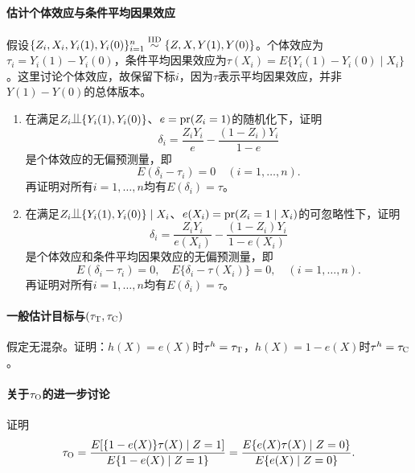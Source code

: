 \paragraph{估计个体效应与条件平均因果效应}\label{hw::individual-effect-prediction}

假设$\{ Z_i, X_i, Y_i(1), Y_i(0) \}_{i=1}^n \stackrel{\textup{IID}}{\sim} \{ Z, X, Y(1), Y(0) \}$。个体效应为$\tau_i = Y_i(1) - Y_i(0)$，条件平均因果效应为$\tau(X_i) = E\{ Y_i(1) - Y_i(0) \mid X_i  \}$。这里讨论个体效应，故保留下标$i$，因为$\tau$表示平均因果效应，并非$Y(1) - Y(0)$的总体版本。 

\begin{enumerate}
\item
在满足$Z_i\ind \{ Y_i(1), Y_i(0)  \}$、$e = \textup{pr}(Z_i = 1)$的随机化下，证明
$$
\delta_i = \frac{Z_i Y_i}{e} - \frac{(1-Z_i)Y_i}{1-e}
$$
是个体效应的无偏预测量，即
$$
E( \delta_i  -  \tau_i ) = 0\quad (i=1,\ldots, n).
$$
再证明对所有$i=1,\ldots, n$均有$E( \delta_i ) = \tau $。 

\item
在满足$Z_i\ind \{ Y_i(1), Y_i(0)  \}\mid X_i$、$e(X_i) = \textup{pr}(Z_i=1\mid X_i)$的可忽略性下，证明
$$
\delta_i = \frac{Z_i Y_i}{ e(X_i) } - \frac{(1-Z_i)Y_i}{1-e(X_i)}
$$
是个体效应和条件平均因果效应的无偏预测量，即
$$
E( \delta_i  -  \tau_i ) = 0, \quad
E\{  \delta_i  -  \tau(X_i) \} = 0, \quad (i=1,\ldots, n).
$$
再证明对所有$i=1,\ldots, n$均有$E( \delta_i ) = \tau $。 
\end{enumerate}
 


\paragraph{一般估计目标与$(\tau_\textsc{T}, \tau_\textsc{C})$}\label{problem::general-estimand-att-atc}


假定无混杂。证明：$h(X) = e(X)$时$\tau^h = \tau_\textsc{T}$，$h(X) = 1-  e(X)$时$\tau^h = \tau_\textsc{C}$。


\paragraph{关于$\tau_\textsc{O}$的进一步讨论}\label{problem::ATO-treated-control}

证明
$$
\tau_\textsc{O} 
=  \frac{   E  [   \{1-e(X)\} \tau(X) \mid Z=1   ]      }{  E  \{ 1-e(X) \mid Z=1   \}   }
=  \frac{   E  \{ e(X) \tau(X) \mid Z=0   \}      }{  E  \{ e(X) \mid Z=0   \}   }.
$$



